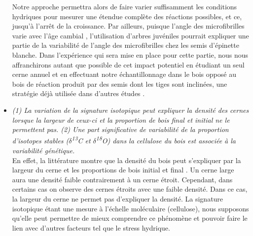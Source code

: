 \documentclass[a4paper,12pt]{report}
\newcommand{\Ctreize}{$\delta$\textsuperscript{13}C\xspace}
\newcommand{\Odixhuit}{$\delta$\textsuperscript{18}O\xspace}
\begin{document}
\begin{itemize}
	Notre approche permettra alors de faire varier suffisamment les conditions hydriques pour mesurer une étendue complète des réactions possibles, et ce, jusqu'à l'arrêt de la croissance. Par ailleurs, puisque l'angle des microfibrilles varie avec l'âge cambial \citep{Lindstrom1998}, l'utilisation d'arbres juvéniles pourrait expliquer une partie de la variabilité de l'angle des microfibrilles chez les semis d'épinette blanche. Dans l'expérience qui sera mise en place pour cette partie, nous nous affranchirons autant que possible de cet impact potentiel en étudiant un seul cerne annuel et en effectuant notre échantillonnage dans le bois opposé au bois de réaction produit par des semis dont les tiges sont inclinées, une stratégie déjà utilisée dans d'autres études \citep{Apiolaza2011}.\\  
	
	\item \emph{(1) La variation de la signature isotopique peut expliquer la densité des cernes lorsque la largeur de ceux-ci et la proportion de bois final et initial ne le permettent pas. (2) Une part significative de variabilité de la proportion d'isotopes stables (\Ctreize et \Odixhuit) dans la cellulose du bois est associée à la variabilité génétique.} \\ 
	
	En effet, la littérature montre que la densité du bois peut s'expliquer par la largeur du cerne et les proportions de bois initial et final \citep{Moore2011}. Un cerne large aura une densité faible contrairement à un cerne étroit. Cependant, dans certains cas on observe des cernes étroits avec une faible densité. Dans ce cas, la largeur du cerne ne permet pas d'expliquer la densité. La signature isotopique étant une mesure à l'échelle moléculaire (cellulose), nous supposons qu'elle peut permettre de mieux comprendre ce phénomène et pouvoir faire le lien avec d'autres facteurs tel que le stress hydrique.\\
	

\end{itemize}
\end{document}
